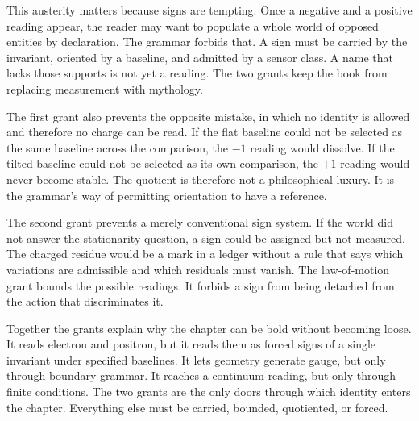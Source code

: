 This austerity matters because signs are tempting. Once a negative and a
positive reading appear, the reader may want to populate a whole world of
opposed entities by declaration. The grammar forbids that. A sign must be
carried by the invariant, oriented by a baseline, and admitted by a sensor
class. A name that lacks those supports is not yet a reading. The two grants
keep the book from replacing measurement with mythology.

The first grant also prevents the opposite mistake, in which no identity is
allowed and therefore no charge can be read. If the flat baseline could not
be selected as the same baseline across the comparison, the \(-1\) reading
would dissolve. If the tilted baseline could not be selected as its own
comparison, the \(+1\) reading would never become stable. The quotient is
therefore not a philosophical luxury. It is the grammar's way of permitting
orientation to have a reference.

The second grant prevents a merely conventional sign system. If the world
did not answer the stationarity question, a sign could be assigned but not
measured. The charged residue would be a mark in a ledger without a rule
that says which variations are admissible and which residuals must vanish.
The law-of-motion grant bounds the possible readings. It forbids a sign from
being detached from the action that discriminates it.

Together the grants explain why the chapter can be bold without becoming
loose. It reads electron and positron, but it reads them as forced signs of a
single invariant under specified baselines. It lets geometry generate gauge,
but only through boundary grammar. It reaches a continuum reading, but only
through finite conditions. The two grants are the only doors through which
identity enters the chapter. Everything else must be carried, bounded,
quotiented, or forced.


